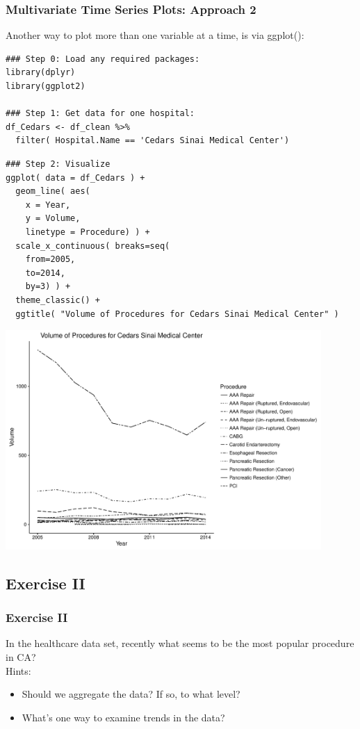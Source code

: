\begin{frame}
 \frametitle{Multivariate Time Series Plots: Approach 2}

Another way to plot more than one variable at a time, is via \ttfamily ggplot()\normalfont :

    \begin{lstlisting}
### Step 0: Load any required packages:
library(dplyr)
library(ggplot2)

### Step 1: Get data for one hospital:
df_Cedars <- df_clean %>%
  filter( Hospital.Name == 'Cedars Sinai Medical Center')
   \end{lstlisting}

\newpage
    \begin{lstlisting}
### Step 2: Visualize
ggplot( data = df_Cedars ) + 
  geom_line( aes(
    x = Year, 
    y = Volume, 
    linetype = Procedure) ) +
  scale_x_continuous( breaks=seq(
    from=2005, 
    to=2014, 
    by=3) ) +
  theme_classic() +
  ggtitle( "Volume of Procedures for Cedars Sinai Medical Center" )
   \end{lstlisting}

\newpage
       \begin{center}
         \includegraphics[width=0.9\textwidth]{images/timeseries_Cedars}
        \end{center}
\end{frame}

\subsection{Exercise II}
\begin{frame}[fragile]
	\frametitle{Exercise II}
	In the healthcare data set, recently what seems to be the most popular procedure in CA?\\
  \vspace{10pt}
  \noindent Hints: \small
    \begin{itemize}
      \item Should we aggregate the data?  If so, to what level?
      \item What's one way to examine trends in the data?
    \end{itemize}

    \normalsize
\end{frame}

